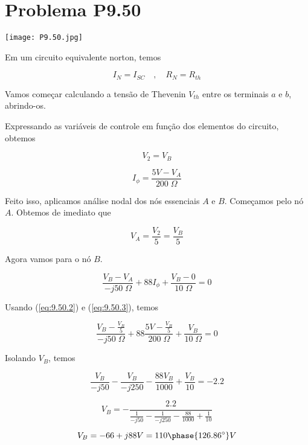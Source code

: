 \section*{Problema P9.50}

\renewcommand*\thesection{9.50}

\begin{center}
    \texttt{[image: P9.50.jpg]}
\end{center}

Em um circuito equivalente norton, temos

\[ I_N = I_{SC} \quad, \quad R_N = R_{th}  \]

Vamos começar calculando a tensão de Thevenin \(V_{th}\) entre os terminais \(a\) e \(b\), abrindo-os.

Expressando as variáveis de controle em função dos elementos do circuito, obtemos

\begin{equation}\label{eq:9.50.1}
    V_{2} = V_B
\end{equation}

\begin{equation}\label{eq:9.50.2}
    I_{\phi} = \frac{5V - V_A}{200 \;\Omega}
\end{equation}

Feito isso, aplicamos análise nodal dos nós essenciais \( A \) e \( B \).
Começamos pelo nó \( A \). Obtemos de imediato que

\begin{equation}\label{eq:9.50.3}
    V_{A} = \frac{V_2}{5} = \frac{V_B}{5}
\end{equation}

Agora vamos para o nó \( B \).

\[ \frac{V_B - V_A}{-j50 \;\Omega} + 88I_{\phi} + \frac{V_B - 0}{10 \;\Omega} = 0 \]

Usando (\ref{eq:9.50.2}) e (\ref{eq:9.50.3}), temos

\[ \frac{V_B - \frac{V_B}{5}}{-j50 \;\Omega} + 88\frac{5V - \frac{V_B}{5}}{200 \;\Omega} + \frac{V_B}{10 \;\Omega} = 0 \]

Isolando \( V_{B} \), temos

\[ \frac{V_B}{-j50} - \frac{V_B}{-j250} - \frac{88V_B}{1000} + \frac{V_B}{10} = - 2.2\]

\[ V_B = - \frac{2.2}{\frac{1}{-j50} - \frac{1}{-j250} - \frac{88}{1000} + \frac{1}{10}}\]

\begin{equation}\label{eq:9.50.4}
    V_{B} = - 66 + j88 V = 110\phase{126.86^{\circ}} V
\end{equation}

